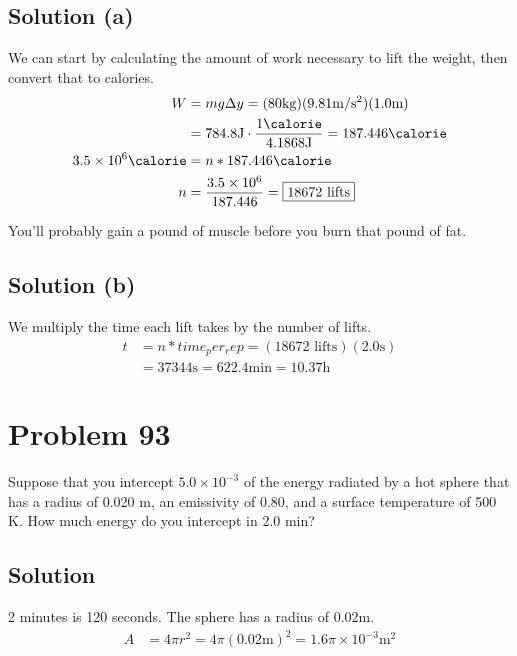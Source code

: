 \documentclass[12pt]{article}
\begin{document}
        \subsection{Solution (a)}
            We can start by calculating the amount of work necessary to lift the weight, then convert that to calories.
            \begin{align}
                W   &=  mg \Delta y
                    =   (80 \unit{\kilo\gram}) (9.81 \unit{\meter/\second^2}) (1.0 \unit{\meter})\\
                    &=  784.8 \unit{\joule} \cdot \frac{1 \unit{\calorie}}{4.1868 \unit{\joule}}
                    =   187.446 \unit{\calorie}\\
                3.5 \times 10^6 \unit{\calorie} &=  n * 187.446 \unit{\calorie}\\
                n   &=  \frac{3.5 \times 10^6}{187.446}
                    =   \boxed{18672 \text{ lifts}}
            \end{align}

            You'll probably gain a pound of muscle before you burn that pound of fat. 

        \subsection{Solution (b)}
            We multiply the time each lift takes by the number of lifts.
            \begin{align}
                t   &=  n * time_per_rep
                    =   (18672 \text{ lifts}) (2.0 \unit{\second})\\
                    &=  \boxed{37344 \unit{\second}
                    =   622.4 \unit{\minute}
                    =   10.37 \unit{\hour}}
            \end{align}

    \pagebreak
    \section{Problem 93}
        Suppose that you intercept $5.0 \times 10^{-3}$ of the energy radiated by a hot sphere that has a radius of 0.020 m, an emissivity of 0.80, and a surface temperature of 500 K. 
        How much energy do you intercept in 2.0 min?

        \subsection{Solution}
            2 minutes is 120 seconds.
            The sphere has a radius of $0.02\unit{\meter}$.
            \begin{align}
                A   &=  4\pi r^2
                    =   4\pi (0.02\unit{\meter})^2
                    =   1.6\pi \times 10^{-3} \unit{\meter^2}
            \end{align}
\end{document}
